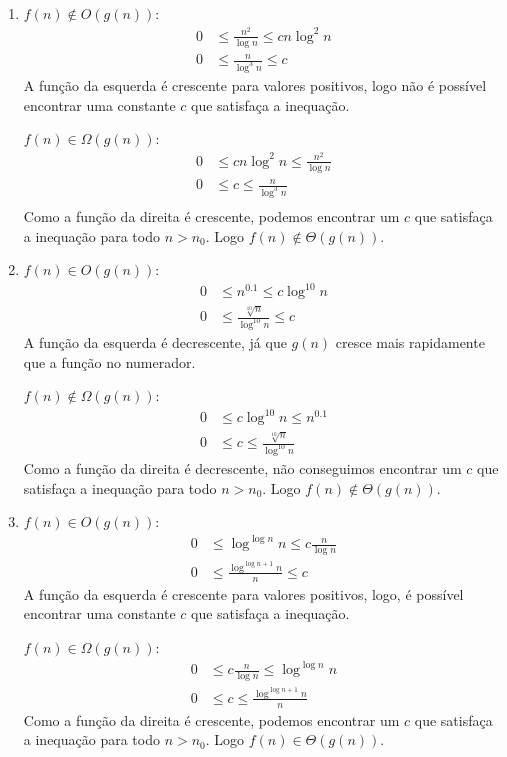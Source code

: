 \documentclass{article}
\begin{document}
\begin{enumerate}
\begin{enumerate}
		\item $f(n) \notin O(g(n))$:
		\begin{align*}
			0 &\le \frac{n^2}{\log n} \le c n \log^2 n \\
			0 &\le \frac{n}{\log^3 n} \le c
		\end{align*}
		A função  da esquerda é crescente para valores positivos, logo não é
		possível encontrar uma constante $c$ que satisfaça a inequação.

		$f(n) \in \Omega(g(n))$:
		\begin{align*}
			0 &\le c n \log^2 n \le \frac{n^2}{\log n} \\
			0 &\le c \le \frac{n}{\log^3 n} \\
		\end{align*}
		Como a função da direita é crescente, podemos encontrar um $c$ que
		satisfaça a inequação para todo $n > n_0$. Logo $f(n) \notin
		\Theta(g(n))$.

		\item $f(n) \in O(g(n))$:
		\begin{align*}
			0 &\le {n^{0.1}} \le c \log^{10} n \\
			0 &\le \frac{\sqrt[10]{n}}{\log^{10} n} \le c
		\end{align*}
		A função da esquerda é decrescente, já que $g(n)$ cresce mais
		rapidamente que a função no numerador.

		$f(n) \notin \Omega(g(n))$:
		\begin{align*}
			0 &\le c \log^{10} n \le {n^{0.1}}\\
			0 &\le c \le \frac{\sqrt[10]{n}}{\log^{10} n}
		\end{align*}
		Como a função da direita é decrescente, não conseguimos encontrar um
		$c$ que satisfaça a inequação para todo $n > n_0$. Logo $f(n) \notin
		\Theta(g(n))$.

		\item $f(n) \in O(g(n))$:
		\begin{align*}
			0 &\le {\log ^{\log n} n} \le c \frac{n}{\log n} \\
			0 &\le \frac{\log ^{\log n + 1} n}{n} \le c
		\end{align*}
		A função da esquerda é crescente para valores positivos, logo, é
		possível encontrar uma constante $c$ que satisfaça a inequação.

		$f(n) \in \Omega(g(n))$:
		\begin{align*}
		0 &\le  c \frac{n}{\log n} \le {\log ^{\log n} n} \\
		0 &\le c \le \frac{\log ^{\log n + 1} n}{n}
		\end{align*}
		Como a função da direita é crescente, podemos encontrar um $c$ que
		satisfaça a inequação para todo $n > n_0$. Logo $f(n) \in
		\Theta(g(n))$.


\end{enumerate}
\end{enumerate}
\end{document}
